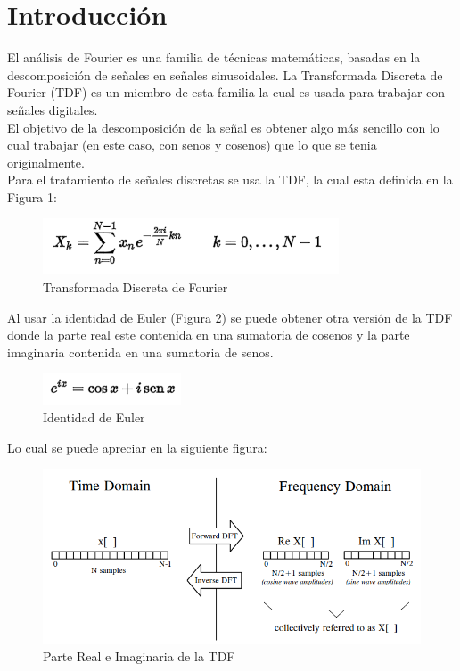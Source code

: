 \section{Introducción}
El análisis de Fourier es una familia de técnicas matemáticas, basadas en la descomposición de señales en señales sinusoidales. La Transformada Discreta de Fourier (TDF) es un miembro de esta familia la cual es usada para trabajar con señales digitales.\\ El objetivo de la descomposición de la señal es obtener algo más sencillo con lo cual trabajar (en este caso, con senos y cosenos) que lo que se tenia originalmente.\\ Para el tratamiento de señales discretas  se usa la TDF, la cual esta definida en la Figura 1:
\begin{figure}[H]
	\centering
	\includegraphics[scale=.8]{img/tdf.png}
	\caption{Transformada Discreta de Fourier}
	\label{fig:prub1}		
\end{figure}
Al usar la identidad de Euler (Figura 2) se puede obtener otra versión de la TDF donde la parte real este contenida en una sumatoria de cosenos y la parte imaginaria contenida en una sumatoria de senos.
\begin{figure}[H]
	\centering
	\includegraphics[scale=.8]{img/euler.png}
	\caption{Identidad de Euler}
	\label{fig:prueb1}		
\end{figure}
Lo cual se puede apreciar en la siguiente figura:
\begin{figure}[H]
	\centering
	\includegraphics[scale=.7]{img/real.png}
	\caption{Parte Real e Imaginaria de la TDF}
	\label{fig:prue1}		
\end{figure}
